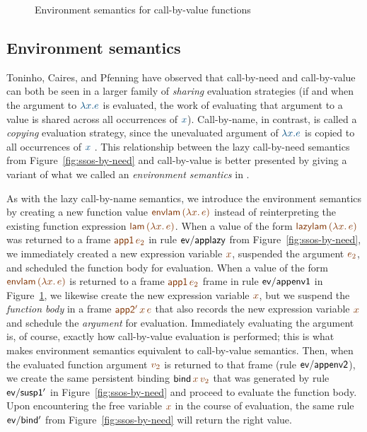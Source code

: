 \begin{figure}
\caption{Environment semantics for call-by-value functions}
\label{fig:ssos-by-env}
\end{figure}

\subsection{Environment semantics}
\label{sec:environment-semantics}

Toninho, Caires, and Pfenning have observed that call-by-need and
call-by-value can both be seen in a larger family of {\it sharing}
evaluation strategies (if and when the argument to $\obj{\lambda x. e}$ is
evaluated, the work of evaluating that argument to a value is shared
across all occurrences of $\obj{x}$). Call-by-name, in contrast, is called a
{\it copying} evaluation strategy, since the unevaluated argument of
$\obj{\lambda x. e}$ is copied to all occurrences of $\obj{x}$
\cite{toninho12functions}. This relationship between the lazy
call-by-need semantics from Figure~\ref{fig:ssos-by-need} and
call-by-value is better presented by giving a variant of what we
called an {\it environment semantics} in
\cite{pfenning09substructural}.


As with the lazy call-by-name semantics, we introduce the environment
semantics by creating a new function value $\lf{{\sf envlam}\,(\lambda
  x.\,e)}$ instead of reinterpreting the existing function expression
$\lf{{\sf lam}\,(\lambda x.\,e)}$. When a value of the form $\lf{{\sf
    lazylam}\,(\lambda x.\,e)}$ was returned to a frame $\lf{{\sf
    app1}\,e_2}$ in rule ${\sf ev/applazy}$ from
Figure~\ref{fig:ssos-by-need}, we immediately created a new expression
variable $\lf{x}$, suspended the argument $\lf{e_2}$, and scheduled the
function body for evaluation. When a value of the form $\lf{{\sf
    envlam}\,(\lambda x.\,e)}$ is returned to a frame $\lf{{\sf
    app1}\,e_2}$ frame in rule ${\sf ev/appenv1}$ in
Figure~\ref{fig:ssos-by-env}, we likewise create the new expression
variable $\lf{x}$, but we suspend the {\it function body} in a frame
$\lf{{\sf app2'}\,x\,e}$ that also records the new expression variable
$\lf{x}$ and schedule the {\it argument} for evaluation. Immediately
evaluating the argument is, of course, exactly how call-by-value
evaluation is performed; this is what makes environment semantics
equivalent to call-by-value semantics.
Then, when the evaluated
function argument $\lf{v_2}$ is returned to that frame (rule ${\sf
  ev/appenv2}$), we create the same persistent binding ${\sf
  bind}\,\lf{x}\,\lf{v_2}$ that was generated by rule ${\sf ev/susp1'}$ in
Figure~\ref{fig:ssos-by-need} and proceed to evaluate the function
body. Upon encountering the free variable $\lf{x}$ in the course of
evaluation, the same rule ${\sf ev/bind'}$ from
Figure~\ref{fig:ssos-by-need} will return the right value.

